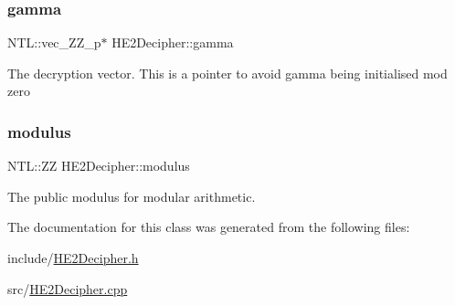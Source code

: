 \subsubsection{\texorpdfstring{gamma}{gamma}}
{\footnotesize\ttfamily N\+T\+L\+::vec\+\_\+\+Z\+Z\+\_\+p$\ast$ H\+E2\+Decipher\+::gamma\hspace{0.3cm}{\ttfamily [protected]}}

The decryption vector. This is a pointer to avoid gamma being initialised mod zero \mbox{\label{classHE2Decipher_ae77640302cf735f4b9b3a74d9da87563}} 
\subsubsection{\texorpdfstring{modulus}{modulus}}
{\footnotesize\ttfamily N\+T\+L\+::\+ZZ H\+E2\+Decipher\+::modulus\hspace{0.3cm}{\ttfamily [protected]}}

The public modulus for modular arithmetic. 

The documentation for this class was generated from the following files\+:\begin{DoxyCompactItemize}
\item 
include/\hyperlink{HE2Decipher_8h}{H\+E2\+Decipher.\+h}\item 
src/\hyperlink{HE2Decipher_8cpp}{H\+E2\+Decipher.\+cpp}\end{DoxyCompactItemize}

